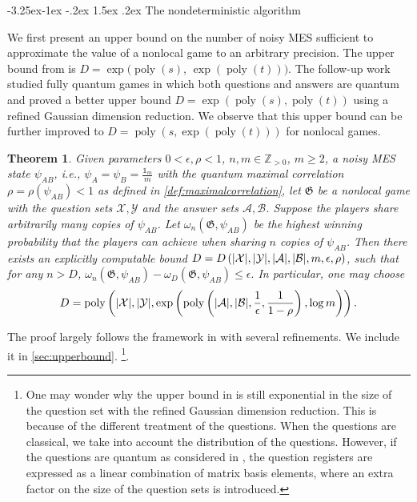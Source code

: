\documentclass[10pt,a4paper]{article}
\makeatletter
\renewcommand{\subsection}{\@startsection{subsection}{2}{\z@}%
             {-3.25ex\@plus -1ex \@minus -.2ex}%
             {1.5ex \@plus .2ex}%
             {\normalfont\large\scshape\bfseries}}
\theoremstyle{plain}
\newtheorem{theorem}{Theorem}[section]
\theoremstyle{definition}
\newcommand {\br} [1] {\ensuremath{ \left( #1 \right) }}
\DeclarePairedDelimiter{\abs}{\lvert}{\rvert}
\newcommand {\id} {\ensuremath{\mathds{1}}}
\newcommand{\posint}{{\mathbb Z}_{>0}}
\newcommand{\poly} {\ensuremath{\operatorname{poly}}}
\newcommand{\calX}{\mathcal{X}}
\newcommand{\calY}{\mathcal{Y}}
\newcommand{\calA}{\mathcal{A}}
\newcommand{\calB}{\mathcal{B}}
\newcommand{\1}{\mathbb{1}} %
\makeatother
\begin{document}
\subsection{The nondeterministic algorithm}
\label{sec:noisy_alg}

We first present an upper bound on the number of noisy MES sufficient to approximate the value of a nonlocal game to an arbitrary precision. 
The upper bound from \cite{qin2021nonlocal} is $D=\exp(\poly(s)$, $\exp\br{\poly(t)})$.
The follow-up work~\cite{qin_et_al:LIPIcs.ICALP.2023.97} studied fully quantum games in which both questions and answers are quantum and proved a better upper bound  $D=\exp\br{\poly(s),\poly(t)}$ using a refined Gaussian dimension reduction. We observe that this upper bound can be further improved to $D=\poly\br{s,\exp\br{\poly(t)}}$ for nonlocal games.
\begin{theorem}\label{thm:upperbound}
		Given parameters $0<\epsilon,\rho<1$, $n,m\in\posint$, $m\geq 2$, a noisy MES state $\psi_{AB}$, i.e.,  $\psi_A=\psi_B=\frac{\id_m}{m}$ with the quantum maximal correlation $\rho=\rho\br{\psi_{AB}}<1$
		as defined in \cref{def:maximalcorrelation}, let $\mathfrak{G}$  be a nonlocal game with the question sets $\calX,\calY$ and the answer sets $\calA,\calB$. Suppose the players share arbitrarily many copies of $\psi_{AB}$. Let $\omega_n(\mathfrak{G},\psi_{AB})$ be the highest winning probability that the players can achieve when sharing $n$ copies of $\psi_{AB}$. Then there exists an explicitly computable bound $D=D\br{\abs{\calX},\abs{\calY},\abs{\calA},\abs{\calB},m,\epsilon,\rho}$, such that 
		for any $n>D$, $\omega_n(\mathfrak{G},\psi_{AB})-\omega_D(\mathfrak{G},\psi_{AB})\leq\epsilon.$
		In particular, one may choose
		$$D=\mathrm{poly}\br{\abs{\calX},\abs{\calY}, \exp\br{\mathrm{poly}\br{\abs{\calA},\abs{\calB},\frac{1}{\epsilon},\frac{1}{1-\rho}},\log m}}.$$
	\end{theorem}
 The proof largely follows the framework in \cite{qin2021nonlocal} with several refinements. We include it in \cref{sec:upperbound}. \footnote{One may wonder why the upper bound in \cite{qin_et_al:LIPIcs.ICALP.2023.97} is still exponential in the size of the question set with the refined Gaussian dimension reduction. This is because of the different treatment of the questions. When the questions are classical, we take into account the distribution of the questions. However, if the questions are quantum as considered in \cite{qin_et_al:LIPIcs.ICALP.2023.97}, the question registers are expressed as a linear combination of matrix basis elements, where an extra factor on the size of the question sets is introduced.}. 
\end{document}
